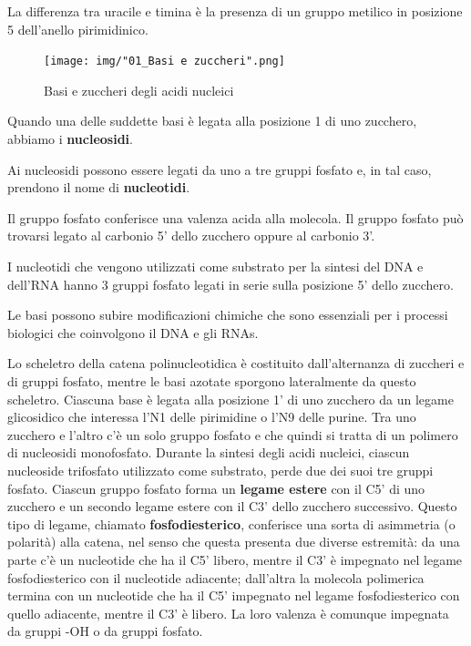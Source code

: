 \documentclass[11pt]{book}
\begin{document}
La differenza tra uracile e timina è la presenza di un gruppo metilico
in posizione 5 dell'anello pirimidinico.

\clearpage
\begin{figure}[htp]
\centering
\texttt{[image: img/"01\_Basi e zuccheri".png]}
\caption{Basi e zuccheri degli acidi nucleici}
\label{Basi e zuccheri}
\end{figure}

Quando una delle suddette basi è legata alla posizione 1 di uno
zucchero, abbiamo i \textbf{nucleosidi}.

Ai nucleosidi possono essere legati da uno a tre gruppi fosfato e, in
tal caso, prendono il nome di \textbf{nucleotidi}.

Il gruppo fosfato conferisce una valenza acida alla molecola. Il gruppo
fosfato può trovarsi legato al carbonio 5' dello zucchero oppure al
carbonio 3'.

I nucleotidi che vengono utilizzati come substrato per la sintesi del
DNA e dell'RNA hanno 3 gruppi fosfato legati in serie sulla posizione 5'
dello zucchero.

Le basi possono subire modificazioni chimiche che sono essenziali per i
processi biologici che coinvolgono il DNA e gli RNAs.

Lo scheletro della catena polinucleotidica è costituito dall'alternanza
di zuccheri e di gruppi fosfato, mentre le basi azotate sporgono
lateralmente da questo scheletro. Ciascuna base è legata alla posizione
1' di uno zucchero da un legame glicosidico che interessa l'N1 delle
pirimidine o l'N9 delle purine. Tra uno zucchero e l'altro c'è un solo
gruppo fosfato e che quindi si tratta di un polimero di nucleosidi
monofosfato. Durante la sintesi degli acidi nucleici, ciascun nucleoside
trifosfato utilizzato come substrato, perde due dei suoi tre gruppi
fosfato. Ciascun gruppo fosfato forma un \textbf{legame estere} con il
C5' di uno zucchero e un secondo legame estere con il C3' dello zucchero
successivo. Questo tipo di legame, chiamato \textbf{fosfodiesterico},
conferisce una sorta di asimmetria (o polarità) alla catena, nel senso
che questa presenta due diverse estremità: da una parte c'è un
nucleotide che ha il C5' libero, mentre il C3' è impegnato nel legame
fosfodiesterico con il nucleotide adiacente; dall'altra la molecola
polimerica termina con un nucleotide che ha il C5' impegnato nel legame
fosfodiesterico con quello adiacente, mentre il C3' è libero. La loro
valenza è comunque impegnata da gruppi -OH o da gruppi fosfato.
\end{document}
